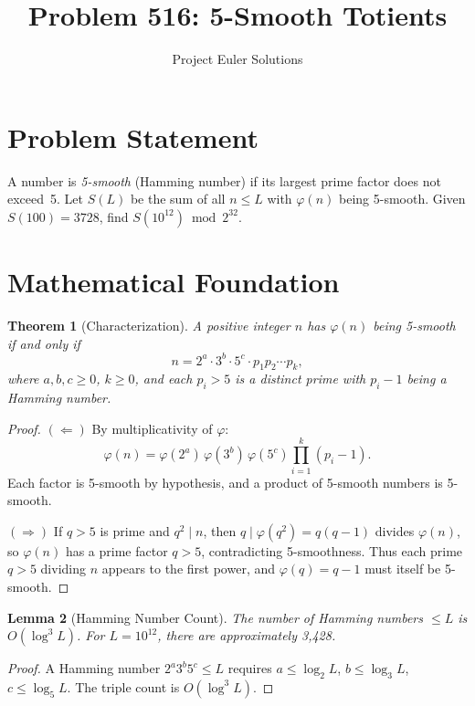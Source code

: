 \documentclass[11pt]{article}
\title{Problem 516: 5-Smooth Totients}
\author{Project Euler Solutions}
\date{}
\newtheorem{theorem}{Theorem}
\newtheorem{lemma}[theorem]{Lemma}
\begin{document}
\maketitle

\section{Problem Statement}

A number is \emph{5-smooth} (Hamming number) if its largest prime factor does not exceed~5. Let $S(L)$ be the sum of all $n \leq L$ with $\varphi(n)$ being 5-smooth. Given $S(100) = 3728$, find $S(10^{12}) \bmod 2^{32}$.

\section{Mathematical Foundation}

\begin{theorem}[Characterization]
A positive integer $n$ has $\varphi(n)$ being 5-smooth if and only if
\[
n = 2^a \cdot 3^b \cdot 5^c \cdot p_1 p_2 \cdots p_k,
\]
where $a, b, c \geq 0$, $k \geq 0$, and each $p_i > 5$ is a distinct prime with $p_i - 1$ being a Hamming number.
\end{theorem}

\begin{proof}
$(\Leftarrow)$\; By multiplicativity of $\varphi$:
\[
\varphi(n) = \varphi(2^a)\,\varphi(3^b)\,\varphi(5^c)\prod_{i=1}^{k}(p_i - 1).
\]
Each factor is 5-smooth by hypothesis, and a product of 5-smooth numbers is 5-smooth.

$(\Rightarrow)$\; If $q > 5$ is prime and $q^2 \mid n$, then $q \mid \varphi(q^2) = q(q-1)$ divides $\varphi(n)$, so $\varphi(n)$ has a prime factor $q > 5$, contradicting 5-smoothness. Thus each prime $q > 5$ dividing $n$ appears to the first power, and $\varphi(q) = q - 1$ must itself be 5-smooth.
\end{proof}

\begin{lemma}[Hamming Number Count]
The number of Hamming numbers $\leq L$ is $O(\log^3 L)$. For $L = 10^{12}$, there are approximately 3{,}428.
\end{lemma}

\begin{proof}
A Hamming number $2^a 3^b 5^c \leq L$ requires $a \leq \log_2 L$, $b \leq \log_3 L$, $c \leq \log_5 L$. The triple count is $O(\log^3 L)$.
\end{proof}
\end{document}
